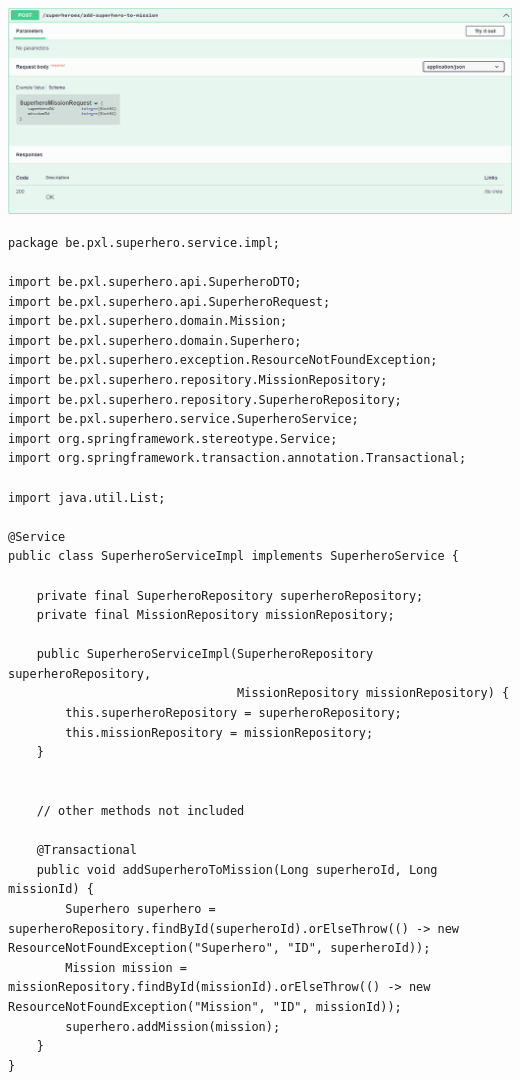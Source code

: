 \begin{itemize}
\includegraphics[width=\textwidth]{./images/chapter-jpa/superhero_controller_add_superhero_to_mission}

\begin{lstlisting}
package be.pxl.superhero.service.impl;

import be.pxl.superhero.api.SuperheroDTO;
import be.pxl.superhero.api.SuperheroRequest;
import be.pxl.superhero.domain.Mission;
import be.pxl.superhero.domain.Superhero;
import be.pxl.superhero.exception.ResourceNotFoundException;
import be.pxl.superhero.repository.MissionRepository;
import be.pxl.superhero.repository.SuperheroRepository;
import be.pxl.superhero.service.SuperheroService;
import org.springframework.stereotype.Service;
import org.springframework.transaction.annotation.Transactional;

import java.util.List;

@Service
public class SuperheroServiceImpl implements SuperheroService {

    private final SuperheroRepository superheroRepository;
    private final MissionRepository missionRepository;

    public SuperheroServiceImpl(SuperheroRepository superheroRepository,
                                MissionRepository missionRepository) {
        this.superheroRepository = superheroRepository;
        this.missionRepository = missionRepository;
    }

   
    // other methods not included 

    @Transactional
    public void addSuperheroToMission(Long superheroId, Long missionId) {
        Superhero superhero = superheroRepository.findById(superheroId).orElseThrow(() -> new ResourceNotFoundException("Superhero", "ID", superheroId));
        Mission mission = missionRepository.findById(missionId).orElseThrow(() -> new ResourceNotFoundException("Mission", "ID", missionId));
        superhero.addMission(mission);
    }
}
\end{lstlisting}


\end{itemize}
